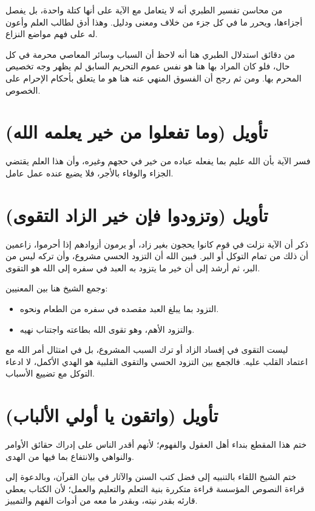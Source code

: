 \begin{fawaid}
من محاسن تفسير الطبري أنه لا يتعامل مع الآية على أنها كتلة واحدة، بل يفصل أجزاءها، ويحرر ما في كل جزء من خلاف ومعنى ودليل. وهذا أدق لطالب العلم وأعون له على فهم مواضع النزاع.
\end{fawaid}

\begin{fawaid}
من دقائق استدلال الطبري هنا أنه لاحظ أن السباب وسائر المعاصي محرمة في كل حال، فلو كان المراد بها هنا هو نفس عموم التحريم السابق لم يظهر وجه تخصيص المحرم بها. ومن ثم رجح أن الفسوق المنهي عنه هنا هو ما يتعلق بأحكام الإحرام على الخصوص.
\end{fawaid}

\separator

\section{تأويل (وما تفعلوا من خير يعلمه الله)}
فسر  الآية بأن الله عليم بما يفعله عباده من خير في حجهم وغيره، وأن هذا العلم يقتضي الجزاء والوفاء بالأجر، فلا يضيع عنده عمل عامل.

\section{تأويل (وتزودوا فإن خير الزاد التقوى)}
ذكر  أن الآية نزلت في قوم كانوا يحجون بغير زاد، أو يرمون أزوادهم إذا أحرموا، زاعمين أن ذلك من تمام التوكل أو البر. فبين الله أن التزود الحسي مشروع، وأن تركه ليس من البر، ثم أرشد إلى أن خير ما يتزود به العبد في سفره إلى الله هو التقوى.

وجمع الشيخ هنا بين المعنيين:
\begin{itemize}
    \item التزود بما يبلغ العبد مقصده في سفره من الطعام ونحوه.
    \item والتزود الأهم، وهو تقوى الله بطاعته واجتناب نهيه.
\end{itemize}

\begin{fawaid}
ليست التقوى في إفساد الزاد أو ترك السبب المشروع، بل في امتثال أمر الله مع اعتماد القلب عليه. فالجمع بين التزود الحسي والتقوى القلبية هو الهدي الأكمل، لا ادعاء التوكل مع تضييع الأسباب.
\end{fawaid}

\section{تأويل (واتقون يا أولي الألباب)}
ختم  هذا المقطع بنداء أهل العقول والفهوم؛ لأنهم أقدر الناس على إدراك حقائق الأوامر والنواهي والانتفاع بما فيها من الهدى.

\separator

ختم الشيخ اللقاء بالتنبيه إلى فضل كتب السنن والآثار في بيان القرآن، وبالدعوة إلى قراءة النصوص المؤسسة قراءة متكررة بنية التعلم والتعليم والعمل؛ لأن الكتاب يعطي قارئه بقدر نيته، وبقدر ما معه من أدوات الفهم والتمييز.
